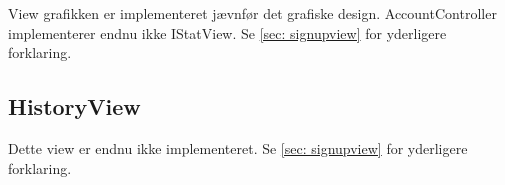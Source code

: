 View grafikken er implementeret jævnfør det grafiske design. AccountController implementerer endnu ikke IStatView. Se \ref{sec: signupview} for yderligere forklaring.

\subsection{HistoryView}

Dette view er endnu ikke implementeret. Se \ref{sec: signupview} for yderligere forklaring.



